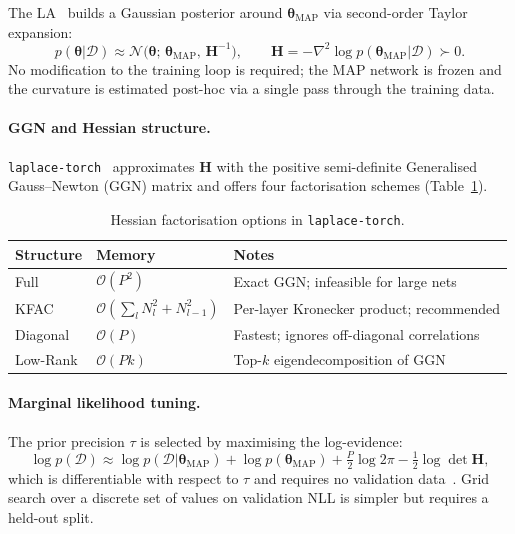 \documentclass[12pt,a4paper]{article}
\newcommand{\btheta}{\bm{\theta}}
\newcommand{\cD}{\mathcal{D}}
\newcommand{\cN}{\mathcal{N}}
\newcommand{\MAP}{\text{MAP}}
\begin{document}
The LA~\citep{daxberger2021laplace} builds a Gaussian posterior around
$\btheta_{\MAP}$ via second-order Taylor expansion:
\begin{equation}
  p(\btheta|\cD) \approx \cN\!\bigl(\btheta;\,\btheta_{\MAP},\,\mathbf{H}^{-1}\bigr),
  \qquad
  \mathbf{H} = -\nabla^2\log p(\btheta_{\MAP}|\cD) \succ 0.
\end{equation}
No modification to the training loop is required; the MAP network is frozen
and the curvature is estimated post-hoc via a single pass through the
training data.

\paragraph{GGN and Hessian structure.}
\texttt{laplace-torch}~\citep{aleximmer2024laplace} approximates $\mathbf{H}$
with the positive semi-definite Generalised Gauss--Newton (GGN) matrix and
offers four factorisation schemes (Table~\ref{tab:hessian}).

\begin{table}[H]
  \centering
  \caption{Hessian factorisation options in \texttt{laplace-torch}.}
  \label{tab:hessian}
  \small
  \begin{tabular}{lll}
    \toprule
    \textbf{Structure} & \textbf{Memory} & \textbf{Notes} \\
    \midrule
    Full     & $\mathcal{O}(P^2)$                       & Exact GGN; infeasible for large nets \\
    KFAC     & $\mathcal{O}(\sum_l N_l^2+N_{l-1}^2)$   & Per-layer Kronecker product; recommended \\
    Diagonal & $\mathcal{O}(P)$                          & Fastest; ignores off-diagonal correlations \\
    Low-Rank & $\mathcal{O}(Pk)$                         & Top-$k$ eigendecomposition of GGN \\
    \bottomrule
  \end{tabular}
\end{table}

\paragraph{Marginal likelihood tuning.}
The prior precision $\tau$ is selected by maximising the log-evidence:
\begin{equation}
  \log p(\cD)
    \approx \log p(\cD|\btheta_{\MAP})
    + \log p(\btheta_{\MAP})
    + \tfrac{P}{2}\log 2\pi
    - \tfrac{1}{2}\log\det\mathbf{H},
  \label{eq:marglik}
\end{equation}
which is differentiable with respect to $\tau$ and requires no validation
data~\citep{daxberger2021laplace}. Grid search over
a discrete set of values on validation NLL is simpler but requires a
held-out split.
\end{document}
